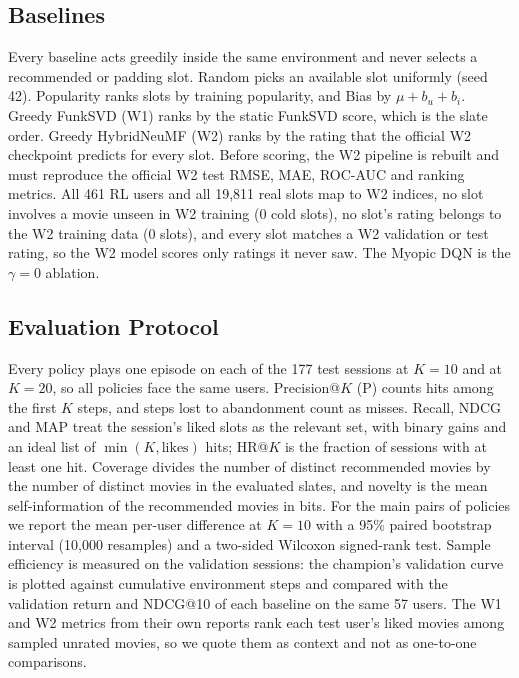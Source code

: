 \subsection{Baselines}
\label{sec:baselines}

Every baseline acts greedily inside the same environment and never selects a recommended or padding slot. Random picks an available slot uniformly (seed 42). Popularity ranks slots by training popularity, and Bias by $\mu + b_u + b_i$. Greedy FunkSVD (W1) ranks by the static FunkSVD score, which is the slate order. Greedy HybridNeuMF (W2) ranks by the rating that the official W2 checkpoint predicts for every slot. Before scoring, the W2 pipeline is rebuilt and must reproduce the official W2 test RMSE, MAE, ROC-AUC and ranking metrics. All 461 RL users and all 19{,}811 real slots map to W2 indices, no slot involves a movie unseen in W2 training (0 cold slots), no slot's rating belongs to the W2 training data (0 slots), and every slot matches a W2 validation or test rating, so the W2 model scores only ratings it never saw. The Myopic DQN is the $\gamma = 0$ ablation.

\subsection{Evaluation Protocol}
\label{sec:protocol}

Every policy plays one episode on each of the 177 test sessions at $K = 10$ and at $K = 20$, so all policies face the same users. Precision@$K$ (P) counts hits among the first $K$ steps, and steps lost to abandonment count as misses. Recall, NDCG and MAP treat the session's liked slots as the relevant set, with binary gains and an ideal list of $\min(K, \text{likes})$ hits; HR@$K$ is the fraction of sessions with at least one hit. Coverage divides the number of distinct recommended movies by the number of distinct movies in the evaluated slates, and novelty is the mean self-information of the recommended movies in bits. For the main pairs of policies we report the mean per-user difference at $K = 10$ with a 95\% paired bootstrap interval (10{,}000 resamples) and a two-sided Wilcoxon signed-rank test. Sample efficiency is measured on the validation sessions: the champion's validation curve is plotted against cumulative environment steps and compared with the validation return and NDCG@10 of each baseline on the same 57 users. The W1 and W2 metrics from their own reports rank each test user's liked movies among sampled unrated movies, so we quote them as context and not as one-to-one comparisons.

